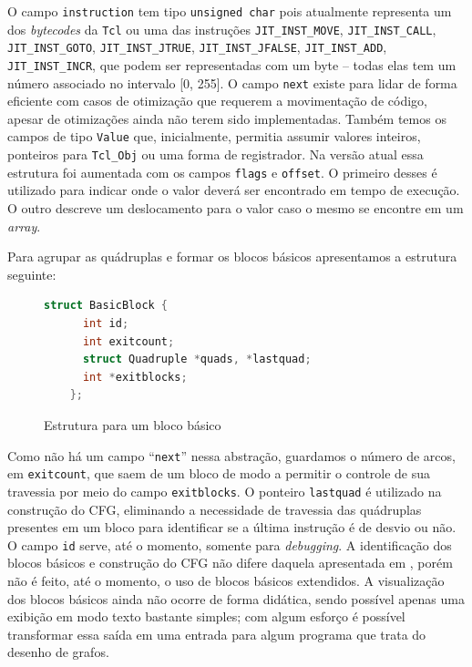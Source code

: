 O campo \verb!instruction! tem tipo \verb!unsigned char! pois atualmente
representa um dos \textit{bytecodes} da \texttt{Tcl} ou uma das
instruções \verb!JIT_INST_MOVE!, \verb!JIT_INST_CALL!,\\
\verb!JIT_INST_GOTO!, \verb!JIT_INST_JTRUE!, \verb!JIT_INST_JFALSE!,
\verb!JIT_INST_ADD!,\\ \verb!JIT_INST_INCR!, que podem ser representadas com um
byte -- todas elas tem um número associado no intervalo [0, 255].
O campo \verb!next! existe para
lidar de forma eficiente com casos de otimização que requerem a
movimentação de código, apesar de otimizações ainda não terem sido
implementadas. Também temos os campos de tipo \verb!Value! que,
inicialmente, permitia assumir valores inteiros, ponteiros para
\verb!Tcl_Obj! ou uma forma de registrador. Na versão atual essa
estrutura foi aumentada com os campos \verb!flags! e \verb!offset!. O
primeiro desses é utilizado para indicar onde o valor deverá
ser encontrado em tempo de execução. O outro descreve um deslocamento
para o valor caso o mesmo se encontre em um \textit{array}.

Para agrupar as quádruplas e formar os blocos básicos apresentamos a
estrutura seguinte:

\begin{figure}[h]
  \centering
  \begin{lstlisting}[language=C]
    struct BasicBlock {
      int id;
      int exitcount;
      struct Quadruple *quads, *lastquad;
      int *exitblocks;
    };
  \end{lstlisting}
  \caption{Estrutura para um bloco básico}
\end{figure}

Como não há um campo ``\verb!next!'' nessa abstração, guardamos o
número de arcos, em \verb!exitcount!, que saem de um bloco de modo a
permitir o controle de sua travessia por meio do campo
\verb!exitblocks!. O ponteiro \verb!lastquad! é
utilizado na construção do CFG, eliminando a necessidade de travessia das
quádruplas presentes em um bloco para identificar se a última
instrução é de desvio ou não. O campo \verb!id! serve, até o momento,
somente para \textit{debugging}. A identificação dos blocos básicos e
construção do CFG não difere daquela apresentada em
, porém não é feito, até o momento, o
uso de blocos básicos extendidos. A visualização dos blocos básicos
ainda não ocorre de forma didática, sendo possível apenas uma exibição
em modo texto bastante simples; com algum esforço é possível
transformar essa saída em uma entrada para algum programa que trata do
desenho de grafos.

